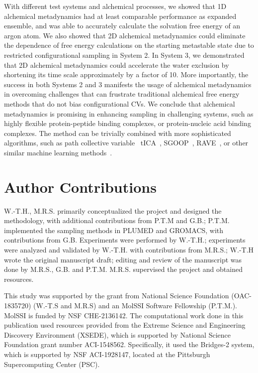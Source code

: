 \documentclass[journal=jacsat,manuscript=article]{achemso}
\begin{document}
With different test systems and alchemical processes, we showed that 1D alchemical metadynamics had at least comparable performance as expanded ensemble, and was able to accurately calculate the solvation free energy of an argon atom. We also showed that 2D alchemical metadynamics could eliminate the dependence of free energy calculations on the starting metastable state due to restricted configurational sampling in System 2. In System 3, we demonstrated that 2D alchemical metadynamics could accelerate the water exclusion by shortening its time scale approximately by a factor of 10. More importantly, the success in both Systems 2 and 3 manifests the usage of alchemical metadynamics in overcoming challenges that can frustrate traditional alchemical free energy methods that do not bias configurational CVs. We conclude that alchemical metadynamics is promising in enhancing sampling in challenging systems, such as highly flexible protein-peptide binding complexes, or protein-nucleic acid binding complexes. The method can be trivially combined with more sophisticated algorithms, such as path collective variable~\cite{branduardi2007b} tICA~\cite{m2017tica}, SGOOP~\cite{tiwary2016spectral}, RAVE~\cite{ribeiro2018reweighted}, or other similar machine learning methods~\cite{rohrdanz2011determination, sultan2018automated, mccarty2017variational, chen2018molecular, wang2019past, wehmeyer2018time}.

\section*{Author Contributions}
W.-T.H., M.R.S. primarily conceptualized the project and designed the methodology, with additional contributions from P.T.M and G.B.; P.T.M. implemented the sampling methods in PLUMED and GROMACS, with contributions from G.B. Experiments were performed by W.-T.H.; experiments were analyzed and validated by W.-T.H. with contributions from M.R.S.; W.-T.H wrote the original manuscript draft; editing and review of the manuscript was done by M.R.S., G.B. and P.T.M. M.R.S. supervised the project and obtained resources.


\begin{acknowledgement}
This study was supported by the grant from National Science Foundation (OAC-1835720) (W.-T.S and M.R.S) and an MolSSI Software Fellowship (P.T.M.). MolSSI is funded by NSF CHE-2136142.  The computational work done in this publication used resources provided from the Extreme Science and Engineering Discovery Environment (XSEDE), which is supported by National Science Foundation grant number ACI-1548562. Specifically, it used the Bridges-2 system, which is supported by NSF  ACI-1928147, located at the Pittsburgh Supercomputing Center (PSC). 

\end{acknowledgement}
\end{document}

